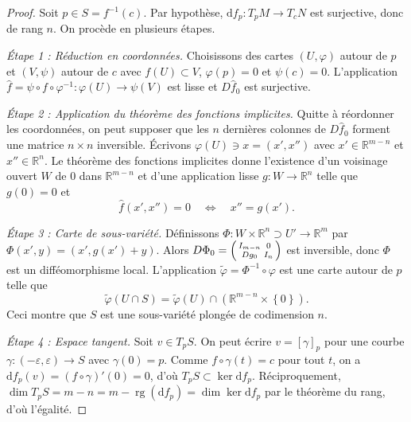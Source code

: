 \documentclass[12pt,a4paper,openany]{book}
\theoremstyle{definition}
\theoremstyle{plain}
\theoremstyle{remark}
\newcommand{\R}{\mathbb{R}}
\DeclareMathOperator{\rg}{rg}
\newcommand{\dd}{\mathrm{d}}
\newcommand{\set}[1]{\left\{#1\right\}}
\begin{document}
\begin{proof}
Soit $p \in S = f^{-1}(c)$. Par hypothèse, $\dd f_p : T_pM \to T_cN$ est surjective,
donc de rang $n$. On procède en plusieurs étapes.

\emph{Étape 1 : Réduction en coordonnées.}
Choisissons des cartes $(U, \varphi)$ autour de $p$ et $(V, \psi)$ autour de $c$
avec $f(U) \subset V$, $\varphi(p) = 0$ et $\psi(c) = 0$.
L'application $\hat{f} = \psi \circ f \circ \varphi^{-1} : \varphi(U) \to \psi(V)$
est lisse et $D\hat{f}_0$ est surjective.

\emph{Étape 2 : Application du théorème des fonctions implicites.}
Quitte à réordonner les coordonnées, on peut supposer que les $n$ dernières
colonnes de $D\hat{f}_0$ forment une matrice $n \times n$ inversible.
Écrivons $\varphi(U) \ni x = (x', x'')$ avec $x' \in \R^{m-n}$ et $x'' \in \R^n$.
Le théorème des fonctions implicites
donne l'existence d'un voisinage ouvert $W$ de $0$ dans $\R^{m-n}$ et d'une
application lisse $g : W \to \R^n$ telle que $g(0) = 0$ et
\[
  \hat{f}(x', x'') = 0 \quad \Longleftrightarrow \quad x'' = g(x').
\]

\emph{Étape 3 : Carte de sous-variété.}
Définissons $\Phi : W \times \R^n \supset U' \to \R^m$ par
$\Phi(x', y) = (x', g(x') + y)$. Alors $D\Phi_0 = \begin{psmallmatrix} I_{m-n} & 0 \\ Dg_0 & I_n \end{psmallmatrix}$
est inversible, donc $\Phi$ est un difféomorphisme local. L'application
$\widetilde{\varphi} = \Phi^{-1} \circ \varphi$ est une carte autour de $p$ telle que
\[
  \widetilde{\varphi}(U \cap S) = \widetilde{\varphi}(U) \cap (\R^{m-n} \times \set{0}).
\]
Ceci montre que $S$ est une sous-variété plongée de codimension $n$.

\emph{Étape 4 : Espace tangent.}
Soit $v \in T_pS$. On peut écrire $v = [\gamma]_p$ pour une courbe $\gamma : (-\varepsilon, \varepsilon) \to S$
avec $\gamma(0) = p$. Comme $f \circ \gamma(t) = c$ pour tout $t$, on a
$\dd f_p(v) = (f \circ \gamma)'(0) = 0$, d'où $T_pS \subset \ker \dd f_p$.
Réciproquement, $\dim T_pS = m - n = m - \rg(\dd f_p) = \dim \ker \dd f_p$
par le théorème du rang, d'où l'égalité.
\end{proof}
\end{document}
